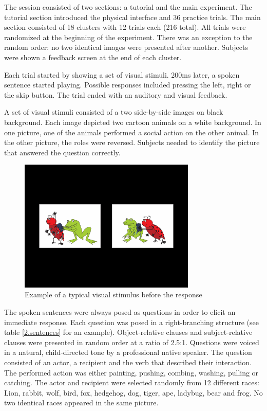 The session consisted of two sections: a tutorial and the main experiment.
The tutorial section introduced the physical interface and 36 practice trials.
The main section consisted of 18 clusters with 12 trials each (216 total).
All trials were randomized at the beginning of the experiment.
There was an exception to the random order: no two identical images were presented after another.
Subjects were shown a feedback screen at the end of each cluster.

Each trial started by showing a set of visual stimuli.
200ms later, a spoken sentence started playing.
Possible responses included pressing the left, right or the skip button.
The trial ended with an auditory and visual feedback.

A set of visual stimuli consisted of a two side-by-side images on black background.
Each image depicted two cartoon animals on a white background.
In one picture, one of the animals performed a social action on the other animal.
In the other picture, the roles were reversed.
Subjects needed to identify the picture that answered the question correctly.

\begin{figure}[h]
\begin{center}
\vspace{7mm}
\includegraphics[width=0.75\textwidth]{pics/2_screen}
\caption{\label{2.screen} Example of a typical visual stimulus before the response}
\end{center}
\end{figure}

The spoken sentences were always posed as questions in order to elicit an immediate response.
Each question was posed in a right-branching structure (see table \ref{2.sentences} for an example).
Object-relative clauses and subject-relative clauses were presented in random order at a ratio of 2.5:1.
Questions were voiced in a natural, child-directed tone by a professional native speaker.
The question consisted of an actor, a recipient and the verb that described their interaction.
The performed action was either painting, pushing, combing, washing, pulling or catching.
The actor and recipient were selected randomly from 12 different races: Lion, rabbit, wolf, bird, fox, hedgehog, dog, tiger, ape, ladybug, bear and frog.
No two identical races appeared in the same picture.

